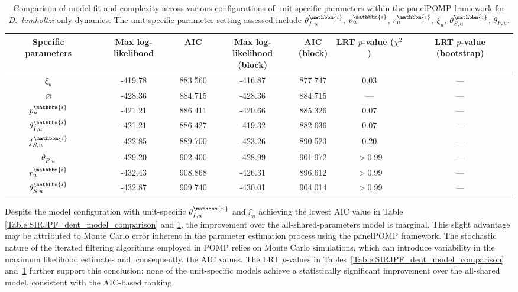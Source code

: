 \documentclass[aoas,preprint]{imsart}\usepackage[]{graphicx}\usepackage[]{xcolor}
\newcommand\unit{u}
\newcommand\native{\mathbbm{n}}
\newcommand\invasive{\mathbbm{i}}
\begin{document}
\begin{table}[h!]
\centering
\begin{center}
\begin{tabular}{||c |c |c |c|c|c|c||}
 \hline
Specific parameters  & Max log-likelihood & AIC & \makecell[c]{Max log-likelihood\\(block)} & \makecell[c]{AIC\\(block)} & \makecell[c]{LRT\\$p$-value\\($\chi^2$)} & \makecell[c]{LRT\\$p$-value\\(bootstrap)}\\ [0.5ex]
 \hline\hline
$\xi_{\unit}$ & -419.78& 883.560& -416.87& 877.747 & 0.03 & --- \\
$\varnothing$  & -428.36& 884.715& -428.36& 884.715 & --- & --- \\
$p^{\invasive}_{\unit}$ & -421.21& 886.411& -420.66& 885.326 & 0.07 & --- \\
$\theta^{\invasive}_{I,\unit}$ & -421.21& 886.427& -419.32& 882.636 & 0.07 & --- \\
$f^{\invasive}_{S,\unit}$ & -422.85& 889.700& -423.26& 890.523 & 0.20 & --- \\
$\theta_{P,\unit}$ & -429.20& 902.400& -428.99& 901.972 & $>$0.99 & --- \\
$r^{\invasive}_{\unit}$ & -432.43& 908.868& -426.31& 896.612 & $>$0.99 & --- \\
$\theta^{\invasive}_{S,\unit}$ & -432.87& 909.740& -430.01& 904.014 & $>$0.99 & --- \\[1ex]
 \hline
\end{tabular}
\end{center}
\caption{Comparison of model fit and complexity across various configurations of unit-specific parameters within the panelPOMP framework for \textit{D.~lumholtzi}-only dynamics. The unit-specific parameter setting assessed include $\theta^{\invasive}_{I,\unit}$, $p^{\invasive}_{\unit}$, $r^{\invasive}_{\unit}$, $\xi_{\unit}$, $\theta^{\invasive}_{S,\unit}$, $\theta_{P,\unit}$.}
\label{Table:SIRJPF_lum_model_comparison}
\end{table}

Despite the model configuration with unit-specific $\theta^{\native}_{I,\unit}$ and $\xi_{\unit}$ achieving the lowest AIC value in Table \ref{Table:SIRJPF_dent_model_comparison} and \ref{Table:SIRJPF_lum_model_comparison}, the improvement over the all-shared-parameters model is marginal.
This slight advantage may be attributed to Monte Carlo error inherent in the parameter estimation process using the panelPOMP framework.
The stochastic nature of the iterated filtering algorithms employed in POMP relies on Monte Carlo simulations, which can introduce variability in the maximum likelihood estimates and, consequently, the AIC values.
The LRT $p$-values in Tables~\ref{Table:SIRJPF_dent_model_comparison} and~\ref{Table:SIRJPF_lum_model_comparison} further support this conclusion: none of the unit-specific models achieve a statistically significant improvement over the all-shared model, consistent with the AIC-based ranking.
\parskip 3mm
\end{document}
